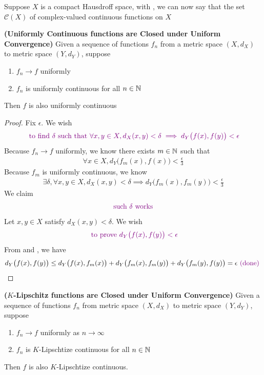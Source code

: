 \documentclass{report}
\begin{document}
\begin{mdframed}
Suppose $X$ is a compact Hausdroff space,  with , we can now say that the set $\mathcal{C}(X)$ of complex-valued continuous functions on $X$ 
\end{mdframed}
\begin{theorem}
\textbf{(Uniformly Continuous functions are Closed under Uniform Convergence)} Given a sequence of functions $f_n$ from a metric space  $(X,d_X)$ to metric space $(Y,d_Y)$, suppose 
\begin{enumerate}[label=(\alph*)]
  \item $f_n\to f$ uniformly 
  \item $f_n$ is uniformly continuous for all  $n\in\mathbb{N}$
\end{enumerate}
Then $f$ is also uniformly continuous
\end{theorem}
\begin{proof}
Fix $\epsilon $. We wish 
\begin{align*}
\textcolor{violet}{\text{ to find $\delta$ such that $\forall x,y \in X, d_X(x,y)<\delta \implies d_Y\big(f(x),f(y) \big)<\epsilon $}}
\end{align*}
Because $f_n\to f$ uniformly, we know there exists  $m \in\mathbb{N}$ such that 
\begin{align}
\label{L1}
\forall x \in X, d_Y\big(f_m(x),f(x) \big)<\frac{\epsilon}{3}
\end{align}
Because $f_m$ is uniformly continuous, we know 
\begin{align}
\label{L2}
\exists \delta, \forall x,y \in X, d_X(x,y)<\delta \implies d_Y\big(f_m(x),f_m(y) \big)<\frac{\epsilon}{3}
\end{align}
We claim 
\begin{align*}
\text{ \textcolor{violet}{such $\delta$ works} }
\end{align*}
Let $x,y \in X$ satisfy $d_X(x,y)<\delta$. We wish 
\begin{align*}
\textcolor{violet}{\text{ to prove }d_Y\big(f(x),f(y) \big)<\epsilon }
\end{align*}
From  and , we have 
\begin{align*}
d_Y\big(f(x),f(y) \big)\leq d_Y\big(f(x),f_m(x) \big)+d_Y\big(f_m(x),f_m(y) \big)+d_Y\big(f_m(y),f(y) \big)=\epsilon \textcolor{violet}{\text{ (done) }}
\end{align*}
\end{proof}
\begin{theorem}
\textbf{($K$-Lipschitz functions are Closed under Uniform Convergence)} Given a sequence of functions $f_n$ from metric space $(X,d_X)$ to metric space $(Y,d_Y)$, suppose 
\begin{enumerate}[label=(\alph*)]
  \item $f_n\to f$ uniformly as $n\to \infty$ 
  \item $f_n$ is $K$-Lipschtize continuous for all $n\in\mathbb{N}$
\end{enumerate}
Then $f$ is also $K$-Lipschtize continuous. 
\end{theorem}
\end{document}
